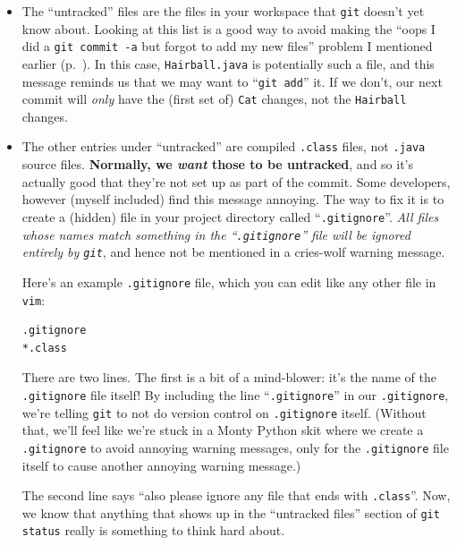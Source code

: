 \begin{itemize}
\item The ``untracked'' files are the files in your workspace that
\texttt{git} doesn't yet know about. Looking at this list is a good way to
avoid making the ``oops I did a \texttt{git commit -a} but forgot to add my
new files'' problem I mentioned earlier (p.~\pageref{commitPitfall}). In this
case, \texttt{Hairball.java} is potentially such a file, and this message
reminds us that we may want to ``\texttt{git add}'' it. If we don't, our next
commit will \textit{only} have the (first set of) \texttt{Cat} changes, not
the \texttt{Hairball} changes.

\item The other entries under ``untracked'' are compiled \texttt{.class}
files, not \texttt{.java} source files. \textbf{Normally, we \textit{want}
those to be untracked}, and so it's actually good that they're not set up as
part of the commit. Some developers, however (myself included) find this
message annoying. The way to fix it is to create a (hidden) file in your
project directory called ``\texttt{.gitignore}''. \textit{All files whose names
match something in the ``\texttt{.gitignore}'' file will be ignored entirely by
\texttt{git}}, and hence not be mentioned in a cries-wolf warning message.

\begin{samepage}
Here's an example \texttt{.gitignore} file, which you can edit like any other
file in \texttt{vim}:

\begin{Verbatim}[fontsize=\small,samepage=true,frame=single]
.gitignore
*.class
\end{Verbatim}
\end{samepage}

There are two lines. The first is a bit of a mind-blower: it's the name of the
\texttt{.gitignore} file itself! By including the line ``\texttt{.gitignore}''
in our \texttt{.gitignore}, we're telling \texttt{git} to not do version
control on \texttt{.gitignore} itself. (Without that, we'll feel like we're
stuck in a Monty Python skit where we create a \texttt{.gitignore} to avoid
annoying warning messages, only for the \texttt{.gitignore} file itself to
cause another annoying warning message.)

The second line says ``also please ignore any file that ends with
\texttt{.class}''. Now, we know that anything that shows up in the ``untracked
files'' section of \texttt{git status} really is something to think hard about.


\end{itemize}
